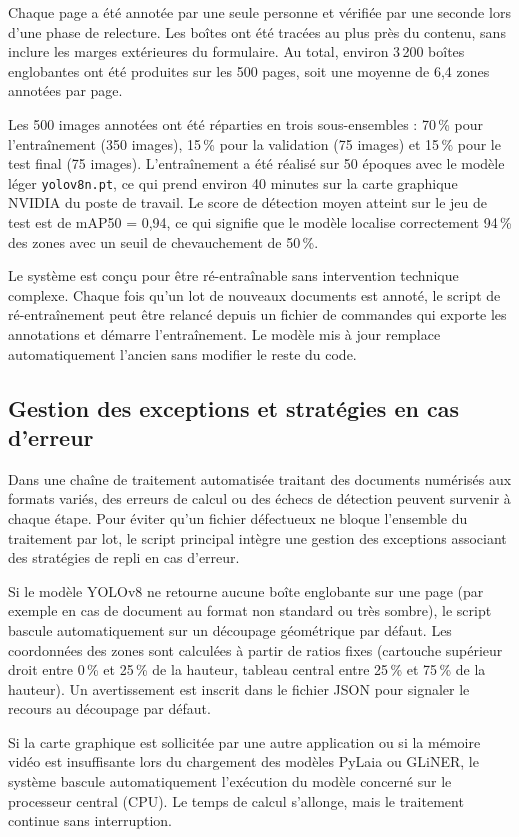 Chaque page a été annotée par une seule personne et vérifiée par une seconde lors d'une phase de relecture. Les boîtes ont été tracées au plus près du contenu, sans inclure les marges extérieures du formulaire. Au total, environ 3\,200 boîtes englobantes ont été produites sur les 500 pages, soit une moyenne de 6,4 zones annotées par page.

Les 500 images annotées ont été réparties en trois sous-ensembles : 70\,\% pour l'entraînement (350 images), 15\,\% pour la validation (75 images) et 15\,\% pour le test final (75 images). L'entraînement a été réalisé sur 50 époques avec le modèle léger \texttt{yolov8n.pt}, ce qui prend environ 40 minutes sur la carte graphique NVIDIA du poste de travail. Le score de détection moyen atteint sur le jeu de test est de mAP50 = 0,94, ce qui signifie que le modèle localise correctement 94\,\% des zones avec un seuil de chevauchement de 50\,\%.

Le système est conçu pour être ré-entraînable sans intervention technique complexe. Chaque fois qu'un lot de nouveaux documents est annoté, le script de ré-entraînement peut être relancé depuis un fichier de commandes qui exporte les annotations et démarre l'entraînement. Le modèle mis à jour remplace automatiquement l'ancien sans modifier le reste du code.


\subsection{Gestion des exceptions et stratégies en cas d'erreur}

Dans une chaîne de traitement automatisée traitant des documents numérisés aux formats variés, des erreurs de calcul ou des échecs de détection peuvent survenir à chaque étape. Pour éviter qu'un fichier défectueux ne bloque l'ensemble du traitement par lot, le script principal intègre une gestion des exceptions associant des stratégies de repli en cas d'erreur.

Si le modèle YOLOv8 ne retourne aucune boîte englobante sur une page (par exemple en cas de document au format non standard ou très sombre), le script bascule automatiquement sur un découpage géométrique par défaut. Les coordonnées des zones sont calculées à partir de ratios fixes (cartouche supérieur droit entre 0\,\% et 25\,\% de la hauteur, tableau central entre 25\,\% et 75\,\% de la hauteur). Un avertissement est inscrit dans le fichier JSON pour signaler le recours au découpage par défaut.

Si la carte graphique est sollicitée par une autre application ou si la mémoire vidéo est insuffisante lors du chargement des modèles PyLaia ou GLiNER, le système bascule automatiquement l'exécution du modèle concerné sur le processeur central (CPU). Le temps de calcul s'allonge, mais le traitement continue sans interruption.

